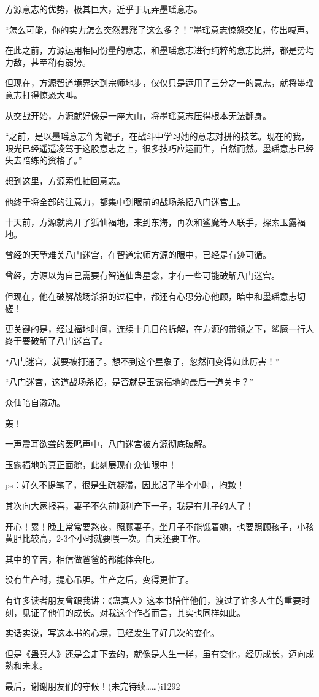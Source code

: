 \begin{this_body}
方源意志的优势，极其巨大，近乎于玩弄墨瑶意志。

“怎么可能，你的实力怎么突然暴涨了这么多？！”墨瑶意志惊怒交加，传出喊声。

在此之前，方源运用相同份量的意志，和墨瑶意志进行纯粹的意志比拼，都是势均力敌，甚至稍有弱势。

但现在，方源智道境界达到宗师地步，仅仅只是运用了三分之一的意志，就将墨瑶意志打得惊恐大叫。

从交战开始，方源就好像是一座大山，将墨瑶意志压得根本无法翻身。

“之前，是以墨瑶意志作为靶子，在战斗中学习她的意志对拼的技艺。现在的我，眼光已经遥遥凌驾于这股意志之上，很多技巧应运而生，自然而然。墨瑶意志已经失去陪练的资格了。”

想到这里，方源索性抽回意志。

他终于将全部的注意力，都集中到眼前的战场杀招八门迷宫上。

十天前，方源就离开了狐仙福地，来到东海，再次和鲨魔等人联手，探索玉露福地。

曾经的天堑难关八门迷宫，在智道宗师方源的眼中，已经是有迹可循。

曾经，方源以为自己需要有智道仙蛊星念，才有一些可能破解八门迷宫。

但现在，他在破解战场杀招的过程中，都还有心思分心他顾，暗中和墨瑶意志切磋！

更关键的是，经过福地时间，连续十几日的拆解，在方源的带领之下，鲨魔一行人终于要破解了八门迷宫了。

“八门迷宫，就要被打通了。想不到这个星象子，忽然间变得如此厉害！”

“八门迷宫，这道战场杀招，是否就是玉露福地的最后一道关卡？”

众仙暗自激动。

轰！

一声震耳欲聋的轰鸣声中，八门迷宫被方源彻底破解。

玉露福地的真正面貌，此刻展现在众仙眼中！

ps：好久不提笔了，很是生疏凝滞，因此迟了半个小时，抱歉！

其次向大家报喜，妻子不久前顺利产下一子，我是有儿子的人了！

开心！累！晚上常常要熬夜，照顾妻子，坐月子不能饿着她，也要照顾孩子，小孩黄胆比较高，2-3个小时就要喂一次。白天还要工作。

其中的辛苦，相信做爸爸的都能体会吧。

没有生产时，提心吊胆。生产之后，变得更忙了。

有许多读者朋友曾跟我讲：《蛊真人》这本书陪伴他们，渡过了许多人生的重要时刻，见证了他们的成长。对我这个作者而言，其实也同样如此。

实话实说，写这本书的心境，已经发生了好几次的变化。

但是《蛊真人》还是会走下去的，就像是人生一样，虽有变化，经历成长，迈向成熟和未来。

最后，谢谢朋友们的守候！(未完待续……)i1292

\end{this_body}

